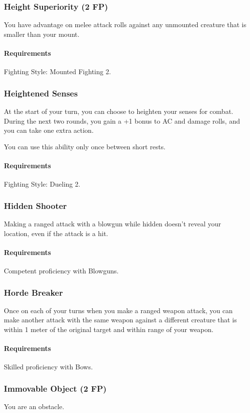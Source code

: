 \subsubsection{Height Superiority (2 FP)} \label{feat::heightsuperiority}
    You have advantage on melee attack rolls against any unmounted creature that is smaller than your mount.
    \paragraph{Requirements} Fighting Style: Mounted Fighting 2.
\subsubsection{Heightened Senses} \label{feat::heightenedsenses}
    At the start of your turn, you can choose to heighten your senses for combat.
    During the next two rounds, you gain a +1 bonus to AC and damage rolls, and you can take one extra action.

    You can use this ability only once between short rests.
    \paragraph{Requirements} Fighting Style: Dueling 2.
\subsubsection{Hidden Shooter} \label{feat::hiddenshooter}
    Making a ranged attack with a blowgun while hidden doesn't reveal your location, even if the attack is a hit.
    \paragraph{Requirements} Competent proficiency with Blowguns.
\subsubsection{Horde Breaker} \label{feat::hordebreaker}
    Once on each of your turns when you make a ranged weapon attack, you can make another attack with the same weapon against a different creature that is within 1 meter of the original target and within range of your weapon.
    \paragraph{Requirements} Skilled proficiency with Bows.
\subsubsection{Immovable Object (2 FP)} \label{feat::immovableobject}
    You are an obstacle.

